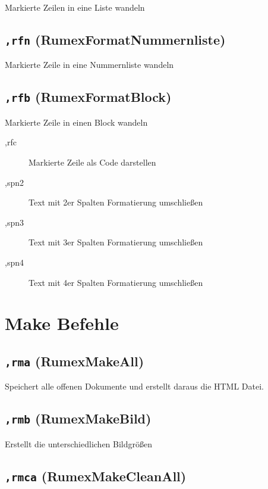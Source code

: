 Markierte Zeilen in eine Liste wandeln

\subsection{\texttt{,rfn}
(RumexFormatNummernliste)}\label{rfn-rumexformatnummernliste}

Markierte Zeile in eine Nummernliste wandeln

\subsection{\texttt{,rfb}
(RumexFormatBlock)}\label{rfb-rumexformatblock}

Markierte Zeile in einen Block wandeln

\begin{description}
\item[,rfc]
Markierte Zeile als Code darstellen
\item[,spn2]
Text mit 2er Spalten Formatierung umschließen
\item[,spn3]
Text mit 3er Spalten Formatierung umschließen
\item[,spn4]
Text mit 4er Spalten Formatierung umschließen
\end{description}

\section{Make Befehle}\label{make-befehle}

\subsection{\texttt{,rma} (RumexMakeAll)}\label{rma-rumexmakeall}

Speichert alle offenen Dokumente und erstellt daraus die HTML Datei.

\subsection{\texttt{,rmb} (RumexMakeBild)}\label{rmb-rumexmakebild}

Erstellt die unterschiedlichen Bildgrößen

\subsection{\texttt{,rmca}
(RumexMakeCleanAll)}\label{rmca-rumexmakecleanall}

